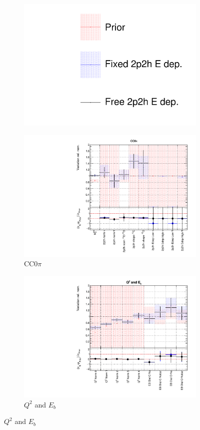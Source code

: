 \begin{figure}
\centering
\begin{subfigure}{0.95\textwidth}
  \centering
  \includegraphics[width=0.25\linewidth]{figs/fixed2p2hfits_leg}
\end{subfigure}
\begin{subfigure}{0.49\textwidth}
  \centering
  \includegraphics[width=0.9\linewidth]{figs/fixed2p2hfitsxsec1}
  \caption{CC0$\pi$}
\end{subfigure}
\begin{subfigure}{0.49\textwidth}
  \centering
  \includegraphics[width=0.9\linewidth]{figs/fixed2p2hfitsxsec2}
  \caption{$Q^2$ and $E_b$}
\end{subfigure}

\end{figure}
